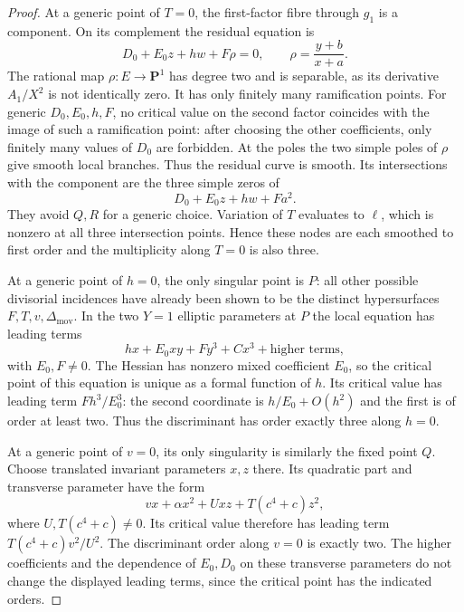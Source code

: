 \begin{proof}
At a generic point of $T=0$, the first-factor fibre through $g_1$
is a component. On its complement the residual equation is
\[
       D_0+E_0z+hw+F\rho=0,\qquad
                     \rho=\frac{y+b}{x+a}.
\]
The rational map $\rho:E\to\mathbf P^1$ has degree two and is
separable, as its derivative $A_1/X^2$ is not identically zero.
It has only finitely many ramification points. For generic
$D_0,E_0,h,F$, no critical value on the second factor coincides
with the image of such a ramification point: after choosing the
other coefficients, only finitely many values of $D_0$ are forbidden.
At the poles the two simple poles of $\rho$ give smooth local
branches. Thus the residual curve is smooth. Its intersections
with the component are the three simple zeros of
\[
                         D_0+E_0z+hw+Fa^2.
\]
They avoid $Q,R$ for a generic choice. Variation of $T$ evaluates
to $\ell$, which is nonzero at all three intersection points.
Hence these nodes are each smoothed to first order and the
multiplicity along $T=0$ is also three.

At a generic point of $h=0$, the only singular point is $P$:
all other possible divisorial incidences have already been shown
to be the distinct hypersurfaces $F,T,v,\Delta_{\mathrm{mov}}$.
In the two $Y=1$ elliptic parameters at $P$ the local equation has
leading terms
\[
          h x+E_0xy+Fy^3+Cx^3+\text{higher terms},
\]
with $E_0,F\ne0$. The Hessian has nonzero mixed coefficient
$E_0$, so the critical point of this equation is unique as a formal
function of $h$. Its critical value has leading term
$Fh^3/E_0^3$: the second coordinate is $h/E_0+O(h^2)$ and the
first is of order at least two. Thus the discriminant has order
exactly three along $h=0$.

At a generic point of $v=0$, its only singularity is similarly the
fixed point $Q$. Choose translated invariant parameters $x,z$ there.
Its quadratic part and transverse parameter have the form
\[
            vx+\alpha x^2+Uxz+T(c^4+c)z^2,
\]
where $U,T(c^4+c)\ne0$. Its critical value therefore has leading
term $T(c^4+c)v^2/U^2$. The discriminant order along $v=0$ is
exactly two. The higher coefficients and the dependence of
$E_0,D_0$ on these transverse parameters do not change the displayed
leading terms, since the critical point has the indicated orders.


\end{proof}
